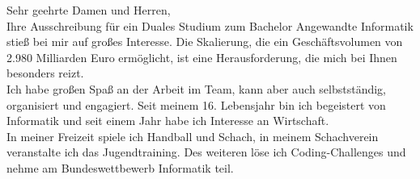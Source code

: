 \documentclass[
	a4paper,
	sidebarwidth=0.34\paperwidth,
]{fortysecondscv}
\begin{document}

\begin{sidebar}
\begin{sidebarminipage}

		\plotlogobefore

		\plotprofilepicture

		\plotlogoafter

		\vspace{1ex}

		\nameandjob

		\vspace*{0.5em}
		\begin{icontable}[1.6]{1.7em}{0.4em}
			\personaldata
		\end{icontable}

\end{sidebarminipage}
\end{sidebar}



{\raggedright \large Sehr geehrte Damen und Herren,\\Ihre Ausschreibung für ein Duales Studium zum Bachelor Angewandte Informatik stieß bei mir auf großes Interesse. Die Skalierung, die ein Geschäftsvolumen von 2.980 Milliarden Euro ermöglicht, ist eine Herausforderung, die mich bei Ihnen besonders reizt.\\Ich habe großen Spaß an der Arbeit im Team, kann aber auch selbstständig, organisiert und engagiert. Seit meinem 16. Lebensjahr bin ich begeistert von Informatik und seit einem Jahr habe ich Interesse an Wirtschaft.\\In meiner Freizeit spiele ich Handball und Schach, in meinem Schachverein veranstalte ich das Jugendtraining. Des weiteren löse ich Coding-Challenges und nehme am Bundeswettbewerb Informatik teil.}

\newpage



\makefrontsidebar
\end{document}
